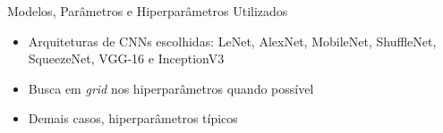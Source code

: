 \begin{frame}{\Large{Modelos, Parâmetros e Hiperparâmetros Utilizados}}
\begin{itemize}
  \item Arquiteturas de CNNs escolhidas: LeNet, AlexNet, MobileNet, ShuffleNet, SqueezeNet, VGG-16 e InceptionV3
\end{itemize}

\begin{table}[h!]
	\centering
	\caption{Valores dos hiperparâmetros selecionados para a elaboração dos modelos.}
	\label{tab:parametros}
\end{table}

\begin{itemize}
  \item Busca em \emph{grid} nos hiperparâmetros quando possível
  \item Demais casos, hiperparâmetros típicos
\end{itemize}

\end{frame}
